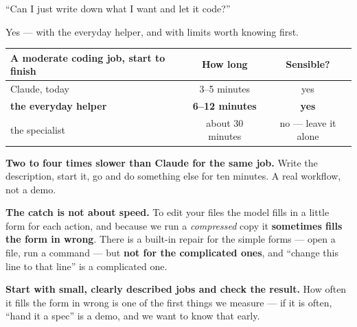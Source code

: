 \documentclass[aspectratio=169]{beamer}
\newcommand{\keybox}[1]{%
  \begin{center}
  \colorbox{black!8}{\parbox{0.92\textwidth}{\centering #1}}
  \end{center}}
\newcommand{\goodbox}[1]{%
  \begin{center}
  \colorbox{green!12}{\parbox{0.92\textwidth}{\centering #1}}
  \end{center}}
\begin{document}
\begin{frame}{``Can I just write down what I want and let it code?''}

{\small Yes --- with the everyday helper, and with limits worth knowing first.}

\begin{center}
\scriptsize
\renewcommand{\arraystretch}{1.25}
\begin{tabular}{@{}lcc@{}}
\toprule
\textbf{A moderate coding job, start to finish} & \textbf{How long} & \textbf{Sensible?} \\
\midrule
Claude, today & 3--5 minutes & yes \\
\textbf{the everyday helper} & \textbf{6--12 minutes} & \textbf{yes} \\
the specialist & about 30 minutes & no --- leave it alone \\
\bottomrule
\end{tabular}
\end{center}

\vspace{0.5em}
\keybox{\small \textbf{Two to four times slower than Claude for the same job.} Write the
description, start it, go and do something else for ten minutes. A real workflow, not a demo.}

\vspace{0.3em}
{\scriptsize \textbf{The catch is not about speed.} To edit your files the model fills in a little
form for each action, and because we run a \emph{compressed} copy it \textbf{sometimes fills the
form in wrong}. There is a built-in repair for the simple forms --- open a file, run a command ---
but \textbf{not for the complicated ones}, and ``change this line to that line'' is a complicated
one.}

\vspace{0.3em}
\goodbox{\scriptsize \textbf{Start with small, clearly described jobs and check the result.} How
often it fills the form in wrong is one of the first things we measure --- if it is often, ``hand it
a spec'' is a demo, and we want to know that early.}

\end{frame}
\end{document}

